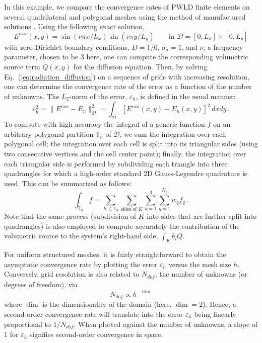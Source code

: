 \documentclass[preprint,10pt]{elsarticle}
\newcommand{\D}{\mathcal{D}}
\newcommand{\eqt}[1]{Eq.~(\ref{#1})}                     %
\newcommand{\tf}{b}
\begin{document}
In this example, we compare the convergence rates of PWLD finite elements on several quadrilateral
and polygonal meshes using the method of manufactured solutions \cite{roache_2009}. Using the following exact solution,
\begin{equation} \label{eq:mms1}
	E^{\textit{exa}}(x,y) = \sin(\nu \pi x/L_x) \sin(\nu\pi y/L_y) \qquad \text{in } \D=[0,L_x]\times [0,L_y]
\end{equation}
with zero-Dirichlet boundary conditions, $D=1/6$, $\sigma_a=1$, and $\nu$, a frequency parameter, chosen to be 3 here, one can compute 
the corresponding volumetric source term $Q(x,y)$ for the diffusion equation. Then, by solving \eqt{eq:radiation_diffusion} 
on a sequence of
grids with increasing resolution, one can determine the convergence rate of the error
as a function of the number of unknowns. The $L_2$-norm of the error, $\varepsilon_h$, is defined in the usual manner:
\begin{equation}
	\varepsilon_h^2 = \| E^{\textit{exa}} - E_h \|^2_\D = \int_\D \left[ E^{\textit{exa}}(x,y)  - E_h(x,y) \right]^2 \, dxdy	\, .
\end{equation}
To compute with high accuracy the integral of a generic function $f$ on an arbitrary polygonal partition $\mathbb{T}_h$ of $\D$, 
we sum the integration over each polygonal cell; the integration over each cell is split into its triangular sides (using two 
consecutive vertices and the cell center point); finally, the integration over each triangular side is performed by 
subdividing each triangle into three quadrangles for which a high-order standard 2D Gauss-Legendre quadrature is used. 
This can be summarized as follows:
\begin{equation}
	\int_{\mathbb{T}_h} f  = \sum_{K\in \mathbb{T}_h} \sum_{\text{sides of }K} \sum_{k=1}^3 
	\sum_{q=1}^{N_q} w_q f_q
	\, .
\end{equation}
Note that the same process (subdivision of $K$ into sides that are further split into quadrangles) is also employed 
to compute accurately the contribution of the volumetric source to the system's right-hand side, $\int_K \tf_i Q$.

For uniform structured meshes, it is fairly straightforward to obtain the asymptotic convergence rate by plotting the error 
$\varepsilon_h$ versus the mesh size $h$. Conversely, grid resolution is also related to $N_\textit{dof}$, the number of unknowns 
(or degrees of freedom), via 
\begin{equation}
N_{\textit{dof}} \propto  h ^{-\dim} 
\end{equation}
where $\dim$ is the dimensionality of the domain (here, $\dim = 2$). Hence, a second-order convergence rate will 
translate into the error $\varepsilon_h$ being linearly proportional to $1/N_{\textit{dof}}$. When plotted against the
number of unknowns, a slope of 1 for $\varepsilon_h$ signifies second-order convergence in space.
\end{document}
